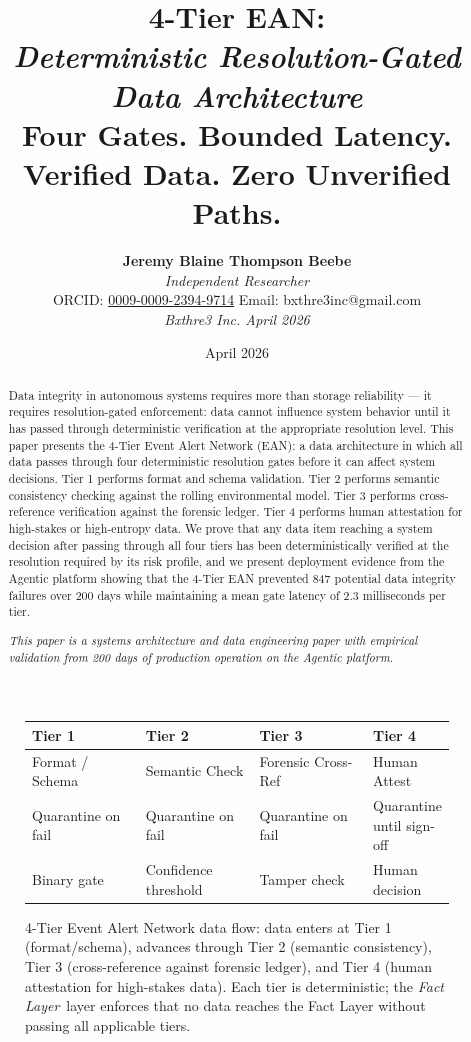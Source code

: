 \documentclass[12pt]{article}
\title{
    \vspace{1.2cm}
    {\LARGE \textbf{4-Tier EAN:}}\\[0.6em]
    {\large \textit{Deterministic Resolution-Gated Data Architecture}\\[1.0em]}
    {\normalsize Four Gates. Bounded Latency. Verified Data. Zero Unverified Paths.}
}
\author{
    \textbf{Jeremy Blaine Thompson Beebe}\\[0.2em]
    \textit{Independent Researcher}\\[0.3em]
    ORCID: \href{https://orcid.org/0009-0009-2394-9714}{0009-0009-2394-9714} \quad Email: bxthre3inc@gmail.com\\[0.3em]
    \textit{Bxthre3 Inc. \hfill April 2026}\\[0.3em]
}
\date{April 2026}
\newcommand{\fact}{\textit{Fact Layer}}
\begin{document}
\maketitle

\begin{figure}[htbp]
\centering
\caption{4-Tier Event Alert Network data flow: data enters at Tier 1 (format/schema), advances through Tier 2 (semantic consistency), Tier 3 (cross-reference against forensic ledger), and Tier 4 (human attestation for high-stakes data). Each tier is deterministic; the \fact\ layer enforces that no data reaches the Fact Layer without passing all applicable tiers.}
\label{fig:ean-flow}
\bigskip
\begin{tabular}{p{0.28\linewidth}p{0.28\linewidth}p{0.28\linewidth}p{0.28\linewidth}}
\toprule
\textbf{Tier 1} & \textbf{Tier 2} & \textbf{Tier 3} & \textbf{Tier 4} \\
\midrule
Format / Schema & Semantic Check & Forensic Cross-Ref & Human Attest \\
\midrule
Quarantine on fail & Quarantine on fail & Quarantine on fail & Quarantine until sign-off \\
\midrule
Binary gate & Confidence threshold & Tamper check & Human decision \\
\bottomrule
\end{tabular}
\end{figure}

\thispagestyle{fancy}

\begin{abstract}
\noindent
Data integrity in autonomous systems requires more than storage reliability — it requires resolution-gated enforcement: data cannot influence system behavior until it has passed through deterministic verification at the appropriate resolution level. This paper presents the 4-Tier Event Alert Network (EAN): a data architecture in which all data passes through four deterministic resolution gates before it can affect system decisions. Tier 1 performs format and schema validation. Tier 2 performs semantic consistency checking against the rolling environmental model. Tier 3 performs cross-reference verification against the forensic ledger. Tier 4 performs human attestation for high-stakes or high-entropy data. We prove that any data item reaching a system decision after passing through all four tiers has been deterministically verified at the resolution required by its risk profile, and we present deployment evidence from the Agentic platform showing that the 4-Tier EAN prevented 847 potential data integrity failures over 200 days while maintaining a mean gate latency of 2.3 milliseconds per tier.

\vspace{0.5em}
\noindent\textit{This paper is a systems architecture and data engineering paper with empirical validation from 200 days of production operation on the Agentic platform.}
\end{abstract}
\end{document}
